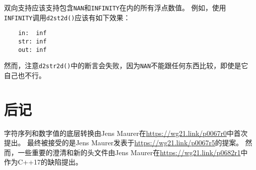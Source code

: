 双向支持应该支持包含\texttt{NAN}和\texttt{INFINITY}在内的所有浮点数值。
例如，使用\texttt{INFINITY}调用\texttt{d2st2d()}应该有如下效果：
\begin{lstlisting}
    in:  inf
    str: inf
    out: inf
\end{lstlisting}
然而，注意\texttt{d2str2d()}中的断言会失败，因为\texttt{NAN}不能跟任何东西比较，即使是它自己也不行。

\section{后记}
字符序列和数字值的底层转换由Jens Maurer在\url{https://wg21.link/p0067r0}中首次提出。
最终被接受的是Jens Maurer发表于\url{https://wg21.link/p0067r5}的提案。
然而，一些重要的澄清和新的头文件由Jens Maurer在\url{https://wg21.link/p0682r1}中
作为C++17的缺陷提出。